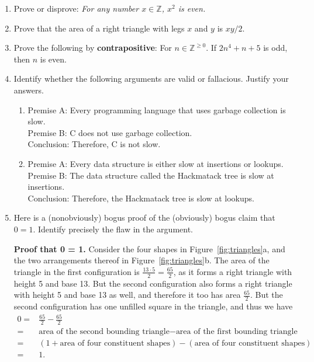 \documentclass[11pt, oneside]{article}   	%
\newcommand{\ints}{\mathbb{Z}}
\begin{document}
\begin{enumerate}
\item Prove or disprove: \textit{For any number $x\in\ints$, $x^2$ is even.}

\item Prove that the area of a right triangle with legs $x$ and $y$ is $xy/2$.


\item Prove the following by \textbf{contrapositive}: For $n\in\ints^{\ge0}$. If $2n^4 +n+5$ is odd, then $n$ is even.

\item 
Identify whether the following arguments are valid or fallacious. Justify your answers.
\begin{enumerate}
\item Premise A: Every programming language that uses garbage collection is slow.\\
Premise B: C does not use garbage collection.\\
Conclusion: Therefore, C is not slow.
\item Premise A: Every data structure is either slow at insertions or lookups.\\ 
Premise B: The data structure called the Hackmatack tree is slow at insertions. \\
Conclusion: Therefore, the Hackmatack tree is slow at lookups.
\end{enumerate}


\item 
\label{q:triangles}  Here is a (nonobviously) bogus proof of the (obviously) bogus claim that $0=1$.
Identify precisely the flaw in the argument. 

\textbf{Proof that 0 = 1.} 
Consider the four shapes in Figure~\ref{fig:triangles}a, 
and the two arrangements thereof in  Figure~\ref{fig:triangles}b. 
The area of the triangle in the first configuration is $\frac{13\cdot5}{2} = \frac{65}{2}$, 
as it forms a right triangle with height 5 and base 13. 
But the second configuration also forms a right triangle with height 5 and base 13 as well, and therefore it too has area $\frac{65}{2}$. 
But the second configuration has one unfilled square in the triangle, and thus we have
\[
\begin{aligned}
0 =& \frac{65}{2} - \frac{65}{2}\\
=& \text{area of the second bounding triangle} - \text{area of the first bounding triangle}\\
 =& (1 + \text{area of four constituent shapes}) - (\text{area of four constituent shapes})\\
 =& 1.
 \end{aligned}
 \]


\end{enumerate}
\end{document}
